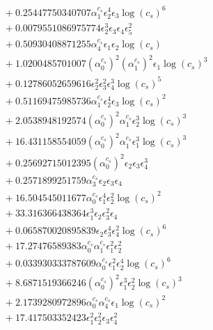 \documentclass[10pt]{article}
\begin{document}
\begin{align*}
&{}  + 0.25447750340707 \alpha_{1}^{c_s} \epsilon_{2}^{4} \epsilon_{3} \log{\left(c_{s} \right)}^{6} \\
&{}  + 0.0079551086975774 \epsilon_{2}^{3} \epsilon_{3} \epsilon_{4} \epsilon_{5}^{2} \\
&{}  + 0.50930408871255 \alpha_{4}^{c_s} \epsilon_{1} \epsilon_{2} \log{\left(c_{s} \right)} \\
&{}  + 1.0200485701007 \left(\alpha_{0}^{c_s}\right)^{2} \left(\alpha_{1}^{c_s}\right)^{2} \epsilon_{1} \log{\left(c_{s} \right)}^{3} \\
&{}  + 0.12786052659616 \epsilon_{2}^{2} \epsilon_{3}^{2} \epsilon_{4}^{3} \log{\left(c_{s} \right)}^{5} \\
&{}  + 0.51169475985736 \alpha_{1}^{c_s} \epsilon_{2}^{4} \epsilon_{3} \log{\left(c_{s} \right)}^{2} \\
&{}  + 2.0538948192574 \left(\alpha_{0}^{c_s}\right)^{2} \alpha_{1}^{c_s} \epsilon_{2}^{3} \log{\left(c_{s} \right)}^{3} \\
&{}  + 16.431158554059 \left(\alpha_{0}^{c_s}\right)^{2} \alpha_{1}^{c_s} \epsilon_{1}^{3} \log{\left(c_{s} \right)}^{3} \\
&{}  + 0.25692715012395 \left(\alpha_{0}^{c_s}\right)^{2} \epsilon_{2} \epsilon_{3} \epsilon_{4}^{3} \\
&{}  + 0.2571899251759 \alpha_{3}^{c_s} \epsilon_{2} \epsilon_{3} \epsilon_{4} \\
&{}  + 16.504545011677 \alpha_{0}^{c_s} \epsilon_{1}^{4} \epsilon_{2}^{2} \log{\left(c_{s} \right)}^{2} \\
&{}  + 33.316366438364 \epsilon_{1}^{3} \epsilon_{2} \epsilon_{3}^{2} \epsilon_{4} \\
&{}  + 0.065870020895839 \epsilon_{2} \epsilon_{3}^{4} \epsilon_{4}^{2} \log{\left(c_{s} \right)}^{6} \\
&{}  + 17.27476589383 \alpha_{0}^{c_s} \alpha_{1}^{c_s} \epsilon_{1}^{2} \epsilon_{2}^{2} \\
&{}  + 0.033930333787609 \alpha_{0}^{c_s} \epsilon_{1}^{2} \epsilon_{2}^{4} \log{\left(c_{s} \right)}^{6} \\
&{}  + 8.6871519366246 \left(\alpha_{0}^{c_s}\right)^{2} \epsilon_{1}^{3} \epsilon_{2}^{2} \log{\left(c_{s} \right)}^{3} \\
&{}  + 2.1739280972896 \alpha_{0}^{c_s} \alpha_{4}^{c_s} \epsilon_{1} \log{\left(c_{s} \right)}^{2} \\
&{}  + 17.417503352423 \epsilon_{1}^{2} \epsilon_{2}^{2} \epsilon_{3} \epsilon_{4}^{2} \\

\end{align*}
\end{document}
